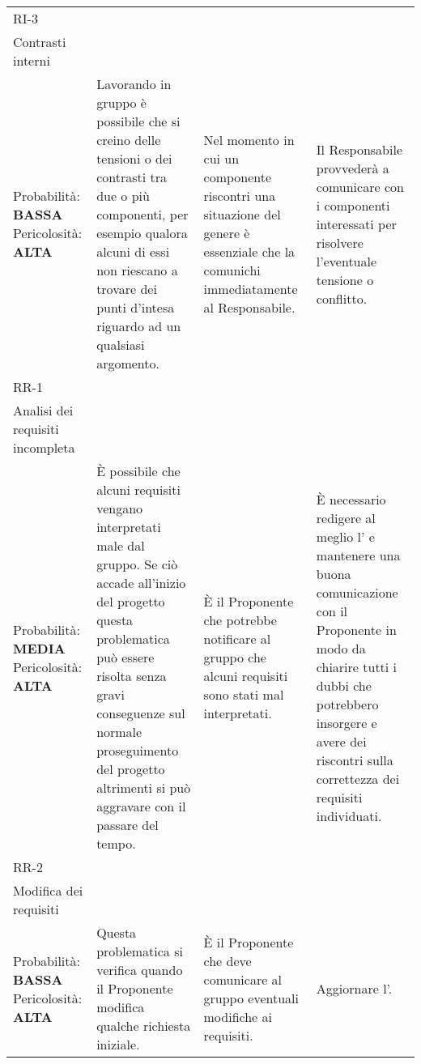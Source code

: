 \begin{longtable}{
		>{\centering}p{}
		>{\centering}p{}
		>{\centering}p{}
		>{\centering\arraybackslash}p{} }
	\rowcolor{lightRowColor}
	RI-3 \\ Contrasti interni \\
		\vspace{5mm} %
		Probabilità: \textbf{BASSA} Pericolosità: \textbf{ALTA} &
		Lavorando in gruppo è possibile che si creino delle tensioni o dei contrasti tra due o più componenti, per esempio qualora alcuni di essi non riescano a trovare dei punti d'intesa riguardo ad un qualsiasi argomento.
		&
		Nel momento in cui un componente riscontri una situazione del genere è essenziale che la comunichi immediatamente al Responsabile.
		&
		Il Responsabile provvederà a comunicare con i componenti interessati per risolvere l'eventuale tensione o conflitto. \\

	\rowcolor{darkRowColor}
	RR-1 \\ Analisi dei requisiti incompleta \\
		\vspace{5mm} %
		Probabilità: \textbf{MEDIA} Pericolosità: \textbf{ALTA} &
		È possibile che alcuni requisiti vengano interpretati male dal gruppo. Se ciò accade all'inizio del progetto questa problematica può essere risolta senza gravi conseguenze sul normale proseguimento del progetto altrimenti si può aggravare con il passare del tempo.
		&
		È il Proponente\ped{\textit{G}} che potrebbe notificare al gruppo che alcuni requisiti sono stati mal interpretati.
		&
		È necessario redigere al meglio l'\textit{\AdR} e mantenere una buona comunicazione con il Proponente\ped{\textit{G}} in modo da chiarire tutti i dubbi che potrebbero insorgere e avere dei riscontri sulla correttezza dei requisiti individuati. \\

	\rowcolor{lightRowColor}
		RR-2 \\ Modifica dei requisiti \\
		\vspace{5mm} %
		Probabilità: \textbf{BASSA} Pericolosità: \textbf{ALTA} &
		Questa problematica si verifica quando il Proponente\ped{\textit{G}} modifica qualche richiesta iniziale.
		&
		È il Proponente\ped{\textit{G}} che deve comunicare al gruppo eventuali modifiche ai requisiti.
		&
		Aggiornare l'\textit{\AdR}. \\
\end{longtable}

